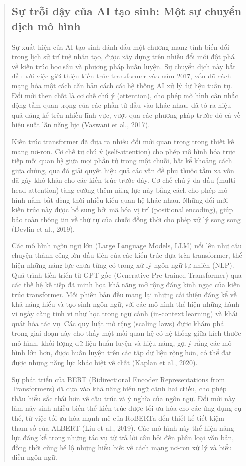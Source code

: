 \begin{quote}
\subsection{Sự trỗi dậy của AI tạo sinh: Một sự chuyển dịch mô hình}

Sự xuất hiện của AI tạo sinh đánh dấu một chương mang tính biến đổi trong lịch sử trí tuệ nhân tạo, được xây dựng trên nhiều đổi mới đột phá về kiến trúc học sâu và phương pháp huấn luyện. Sự chuyển dịch này bắt đầu với việc giới thiệu kiến trúc transformer vào năm 2017, vốn đã cách mạng hóa một cách căn bản cách các hệ thống AI xử lý dữ liệu tuần tự. Đổi mới then chốt là cơ chế chú ý (attention), cho phép mô hình cân nhắc động tầm quan trọng của các phần tử đầu vào khác nhau, đã tỏ ra hiệu quả đáng kể trên nhiều lĩnh vực, vượt qua các phương pháp trước đó cả về hiệu suất lẫn năng lực (Vaswani et al., 2017).

Kiến trúc transformer đã đưa ra nhiều đổi mới quan trọng trong thiết kế mạng nơ-ron. Cơ chế tự chú ý (self-attention) cho phép mô hình hóa trực tiếp mối quan hệ giữa mọi phần tử trong một chuỗi, bất kể khoảng cách giữa chúng, qua đó giải quyết hiệu quả các vấn đề phụ thuộc tầm xa vốn đã gây khó khăn cho các kiến trúc trước đây. Cơ chế chú ý đa đầu (multi-head attention) tăng cường thêm năng lực này bằng cách cho phép mô hình nắm bắt đồng thời nhiều kiểu quan hệ khác nhau. Những đổi mới kiến trúc này được bổ sung bởi mã hóa vị trí (positional encoding), giúp bảo toàn thông tin về thứ tự của chuỗi đồng thời cho phép xử lý song song (Devlin et al., 2019).

Các mô hình ngôn ngữ lớn (Large Language Models, LLM) nổi lên như câu chuyện thành công lớn đầu tiên của các kiến trúc dựa trên transformer, thể hiện những năng lực chưa từng có trong xử lý ngôn ngữ tự nhiên (NLP). Quá trình tiến triển từ GPT gốc (Generative Pre-trained Transformer) qua các thế hệ kế tiếp đã minh họa khả năng mở rộng đáng kinh ngạc của kiến trúc transformer. Mỗi phiên bản đều mang lại những cải thiện đáng kể về khả năng hiểu và tạo sinh ngôn ngữ, với các mô hình thể hiện những hành vi ngày càng tinh vi như học trong ngữ cảnh (in-context learning) và khái quát hóa tác vụ. Các quy luật mở rộng (scaling laws) được khám phá trong giai đoạn này cho thấy một mối quan hệ có hệ thống giữa kích thước mô hình, khối lượng dữ liệu huấn luyện và hiệu năng, gợi ý rằng các mô hình lớn hơn, được huấn luyện trên các tập dữ liệu rộng hơn, có thể đạt được những năng lực khác biệt về chất (Kaplan et al., 2020).

Sự phát triển của BERT (Bidirectional Encoder Representations from Transformers) đã đưa vào khả năng hiểu ngữ cảnh hai chiều, cho phép thấu hiểu sắc thái hơn về cấu trúc và ý nghĩa của ngôn ngữ. Đổi mới này làm nảy sinh nhiều biến thể kiến trúc được tối ưu hóa cho các ứng dụng cụ thể, từ việc tối ưu hóa mạnh mẽ của RoBERTa đến thiết kế tiết kiệm tham số của ALBERT (Liu et al., 2019). Các mô hình này thể hiện năng lực đáng kể trong những tác vụ từ trả lời câu hỏi đến phân loại văn bản, đồng thời cũng hé lộ những hiểu biết về cách mạng nơ-ron xử lý và biểu diễn ngôn ngữ.


\end{quote}
